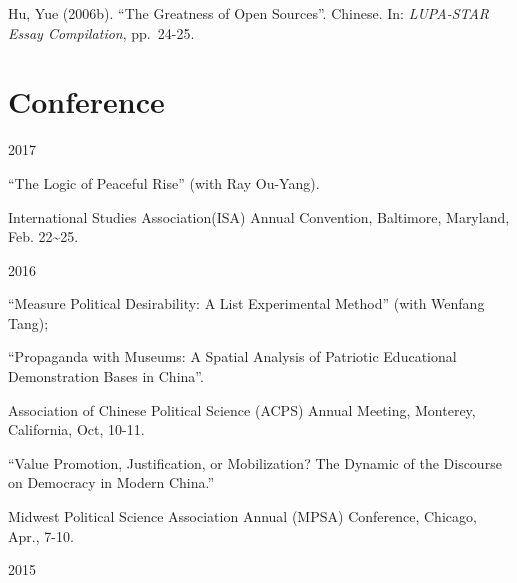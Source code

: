 \documentclass[10.5pt,]{article}
\providecommand{\tightlist}{%
  \setlength{\itemsep}{0pt}\setlength{\parskip}{0pt}}
\renewenvironment{itemize}{
  \begin{list}{}{
    \setlength{\leftmargin}{1.5em}
  }
}{
  \end{list}
}
\begin{document}
Hu, Yue (2006b). ``The Greatness of Open Sources''. Chinese. In:
\emph{LUPA-STAR Essay Compilation}, pp.~24-25.

\section{Conference}\label{conference}

\begin{itemize}
\tightlist
\item
  2017

  \begin{itemize}
  \tightlist
  \item
    ``The Logic of Peaceful Rise'' (with Ray Ou-Yang).

    \begin{itemize}
    \tightlist
    \item
      \footnotesize International Studies Association(ISA) Annual
      Convention, Baltimore, Maryland, Feb. 22\textasciitilde{}25.
    \end{itemize}
  \end{itemize}
\item
  2016

  \begin{itemize}
  \tightlist
  \item
    ``Measure Political Desirability: A List Experimental Method'' (with
    Wenfang Tang);
  \item
    ``Propaganda with Museums: A Spatial Analysis of Patriotic
    Educational Demonstration Bases in China''.

    \begin{itemize}
    \tightlist
    \item
      \footnotesize Association of Chinese Political Science (ACPS)
      Annual Meeting, Monterey, California, Oct, 10-11.
    \end{itemize}
  \item
    ``Value Promotion, Justification, or Mobilization? The Dynamic of
    the Discourse on Democracy in Modern China.''

    \begin{itemize}
    \tightlist
    \item
      \footnotesize Midwest Political Science Association Annual (MPSA)
      Conference, Chicago, Apr., 7-10.
    \end{itemize}
  \end{itemize}
\item
  2015


\end{itemize}
\end{document}
